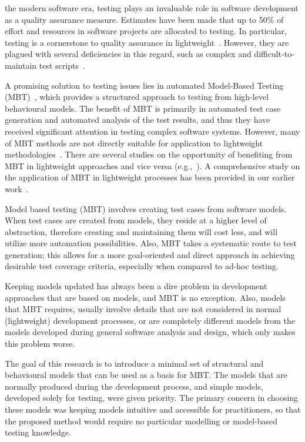 %
%
\label{sec:introduction}
 the modern software era, testing plays an invaluable role in software development as a quality assurance measure. Estimates have been made that up to 50\% of effort and resources in software projects are allocated to testing. In particular, testing is a cornerstone to quality assurance in lightweight~\cite{Beck2002}. However, they are plagued with several deficiencies in this regard, such as complex and difficult-to-maintain test scripts~\cite{Farago2010a}.

A promising solution to testing issues lies in automated Model-Based Testing (MBT)~\cite{Tretmans2008}, which provides a structured approach to testing from high-level behavioural models. The benefit of MBT is primarily in automated test case generation and automated analysis of the test results, and thus they have received significant attention in testing complex software systems. However, many of MBT methods are not directly suitable for application to lightweight methodologies~\cite{Farago2010a}. There are several studies on the  opportunity of benefiting from MBT in lightweight approaches and vice versa (e.g.,~\cite{Katara2006,Farago2010b,Loffler2010,Ussami2016}). A comprehensive study on the application of MBT in lightweight processes has been provided in our earlier work~\cite{Jalalinasab2012}.

Model based testing (MBT) involves creating test cases from software models. When test cases are created from models, they reside at a higher level of abstraction, therefore creating and maintaining them will cost less, and will utilize more automation possibilities. Also, MBT takes a systematic route to test generation; this allows for a more goal-oriented and direct approach in achieving desirable test coverage criteria, especially when compared to ad-hoc testing. 

Keeping models updated has always been a dire problem in development approaches that are based on models, and MBT is no exception. Also, models that MBT requires, usually involve details that are not considered in normal (lightweight) development processes, or are completely different models from the models developed during general software analysis and design, which only makes this problem worse.

The goal of this research is to introduce a minimal set of structural and behavioural models that can be used as a basis for MBT. The models that are normally produced during the development process, and simple models, developed solely for testing, were given priority. The primary concern in choosing these models was keeping models intuitive and accessible for practitioners, so that the proposed method would require no particular modelling or model-based testing knowledge. %

